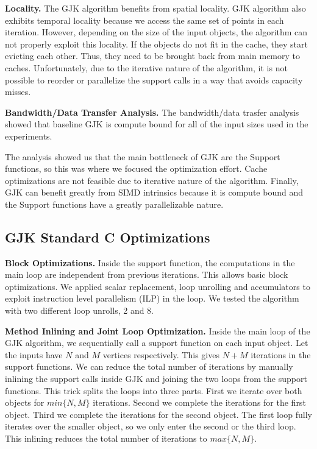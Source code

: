 \documentclass[twocolumn]{article}
\newcommand{\mypar}[1]{{\bf #1.}}
\begin{document}
\mypar{Locality}
The GJK algorithm benefits from spatial locality. GJK algorithm also exhibits temporal locality because we access the same set of points in each iteration. However, depending on the size of the input objects, the algorithm can not properly exploit this locality. If the objects do not fit in the cache, they start evicting each other. Thus, they need to be brought back from main memory to caches. Unfortunately, due to the iterative nature of the algorithm, it is not possible to reorder or parallelize the support calls in a way that avoids capacity misses. 

\mypar{Bandwidth/Data Transfer Analysis}
The bandwidth/data trasfer analysis showed that baseline GJK is compute bound for all of the input sizes used in the experiments. 

The analysis showed us that the main bottleneck of GJK are the Support functions, so this was where we focused the optimization effort. Cache optimizations are not feasible due to iterative nature of the algorithm. Finally, GJK can benefit greatly from SIMD intrinsics because it is compute bound and the Support functions have a greatly parallelizable nature.

\subsection{GJK Standard C Optimizations}
\mypar{Block Optimizations}
Inside the support function, the computations in the main loop are independent from previous iterations. This allows basic block optimizations. We applied scalar replacement, loop unrolling and accumulators to exploit instruction level parallelism (ILP) in the loop. We tested the algorithm with two different loop unrolls, 2 and 8.

\mypar{Method Inlining and Joint Loop Optimization}
Inside the main loop of the GJK algorithm, we sequentially call a support function on each input object. Let the inputs have $N$ and $M$ vertices respectively. This gives $N + M$ iterations in the support functions. We can reduce the total number of iterations by manually inlining the support calls inside GJK and joining the two loops from the support functions. This trick splits the loops into three parts. First we iterate over both objects for $min\{N, M\}$ iterations. Second we complete the iterations for the first object. Third we complete the iterations for the second object. The first loop fully iterates over the smaller object, so we only enter the second or the third loop. This inlining reduces the total number of iterations to $max\{N, M\}$.
\end{document}
